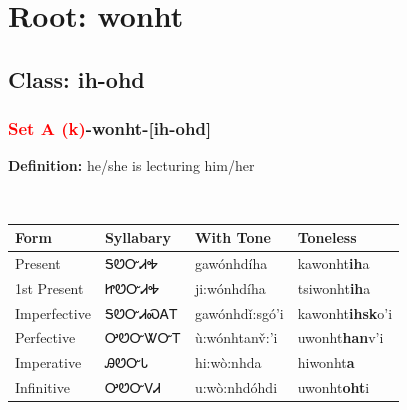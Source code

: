 \needspace{4in}
\section*{Root: wonht}
\nopagebreak
{}
\needspace{3in}
\subsection*{Class: ih-ohd}
\nopagebreak
\needspace{2in}
\subsubsection*{\textcolor{Red}{Set A (k)}{-}\textbf{wonht}{-}[ih-ohd]}
\nopagebreak
\textbf{Definition: } he/she is lecturing him/her
\\[0.5em]
\begin{tabularx}{\textwidth}{l X X X}%
\toprule%
\textbf{Form}&\textbf{Syllabary}&\textbf{With Tone}&\textbf{Toneless}\\%
\midrule%
Present&ᎦᏬᏅᏗᎭ&gawónhdíha&kawonht\textbf{ih}a\\%
1st Present&ᏥᏬᏅᏗᎭ&ji:wónhdíha&tsiwonht\textbf{ih}a\\%
Imperfective&ᎦᏬᏅᏗᏍᎪᎢ&gawónhdǐ:sgó’i&kawonht\textbf{ihsk}o'i\\%
Perfective&ᎤᏬᏅᏔᏅᎢ&ù:wónhtanv̌:’i&uwonht\textbf{han}v'i\\%
Imperative&ᎯᏬᏅᏓ&hi:wò:nhda&hiwonht\textbf{a}\\%
Infinitive&ᎤᏬᏅᏙᏗ&u:wò:nhdóhdi&uwonht\textbf{oht}i\\%
\bottomrule%
\end{tabularx}
\\[1em]